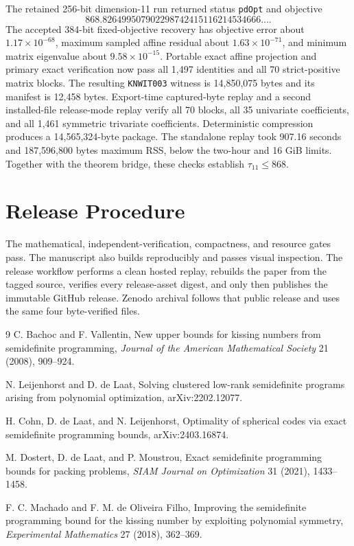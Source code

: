 \documentclass[11pt]{article}
\begin{document}
The retained 256-bit dimension-11 run returned status \texttt{pdOpt} and
objective
\[
868.826499507902298742415116214534666\ldots.
\]
The accepted 384-bit fixed-objective recovery has objective error about
$1.17\times 10^{-68}$, maximum sampled affine residual about
$1.63\times 10^{-71}$, and minimum matrix eigenvalue about
$9.58\times 10^{-15}$. Portable exact affine projection and primary exact
verification now pass all 1,497 identities and all 70 strict-positive matrix
blocks. The resulting \texttt{KNWIT003} witness is 14,850,075 bytes and its
manifest is 12,458 bytes. Export-time captured-byte replay and a second
installed-file release-mode replay verify all 70 blocks, all 35 univariate
coefficients, and all 1,461 symmetric trivariate coefficients. Deterministic
compression produces a 14,565,324-byte package. The standalone replay took
907.16 seconds and 187,596,800 bytes maximum RSS, below the two-hour and
16 GiB limits. Together with the theorem bridge, these checks establish
\(\tau_{11}\leq868\).

\section{Release Procedure}

The mathematical, independent-verification, compactness, and resource gates
pass. The manuscript also builds reproducibly and passes visual inspection.
The release workflow performs a clean hosted replay, rebuilds the paper from
the tagged source, verifies every release-asset digest, and only then
publishes the immutable GitHub release. Zenodo archival follows that public
release and uses the same four byte-verified files.

\begin{thebibliography}{9}
C. Bachoc and F. Vallentin,
New upper bounds for kissing numbers from semidefinite programming,
\emph{Journal of the American Mathematical Society} 21 (2008), 909--924.

N. Leijenhorst and D. de Laat,
Solving clustered low-rank semidefinite programs arising from polynomial
optimization, arXiv:2202.12077.

H. Cohn, D. de Laat, and N. Leijenhorst,
Optimality of spherical codes via exact semidefinite programming bounds,
arXiv:2403.16874.

M. Dostert, D. de Laat, and P. Moustrou,
Exact semidefinite programming bounds for packing problems,
\emph{SIAM Journal on Optimization} 31 (2021), 1433--1458.

F. C. Machado and F. M. de Oliveira Filho,
Improving the semidefinite programming bound for the kissing number by
exploiting polynomial symmetry,
\emph{Experimental Mathematics} 27 (2018), 362--369.
\end{thebibliography}
\end{document}
